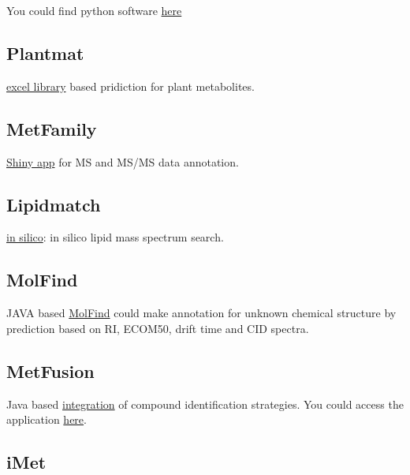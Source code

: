 \documentclass[
]{book}
\begin{document}
You could find python software \href{http://www.biosciences-labs.bham.ac.uk/viant/mipack/}{here}\citep{weber2010}

\hypertarget{plantmat}{%
\subsection{Plantmat}\label{plantmat}}

\href{https://sourceforge.net/projects/plantmat/}{excel library} based pridiction for plant metabolites\citep{qiu2016}.

\hypertarget{metfamily}{%
\subsection{MetFamily}\label{metfamily}}

\href{https://msbi.ipb-halle.de/MetFamily/}{Shiny app} for MS and MS/MS data annotation\citep{treutler2016}.

\hypertarget{lipidmatch}{%
\subsection{Lipidmatch}\label{lipidmatch}}

\href{http://secim.ufl.edu/secim-tools/lipidmatch/}{in silico}: in silico lipid mass spectrum search\citep{koelmel2017}.

\hypertarget{molfind}{%
\subsection{MolFind}\label{molfind}}

JAVA based \href{http://metabolomics.pharm.uconn.edu/?q=Software.html}{MolFind} could make annotation for unknown chemical structure by prediction based on RI, ECOM50, drift time and CID spectra\citep{menikarachchi2012}.

\hypertarget{metfusion}{%
\subsection{MetFusion}\label{metfusion}}

Java based \href{https://github.com/mgerlich/MetFusion}{integration} of compound identiﬁcation strategies. You could access the application \href{https://msbi.ipb-halle.de/MetFusion/}{here}\citep{gerlich2013}.

\hypertarget{imet}{%
\subsection{iMet}\label{imet}}
\end{document}
